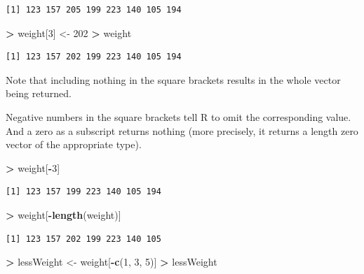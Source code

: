 \documentclass[]{krantz}
\makeatletter
\newenvironment{Shaded}{\begin{snugshade}}{\end{snugshade}}
\newcommand{\DecValTok}[1]{\textcolor[rgb]{0.06,0.06,0.06}{#1}}
\newcommand{\KeywordTok}[1]{\textcolor[rgb]{0.27,0.27,0.27}{\textbf{#1}}}
\newcommand{\NormalTok}[1]{#1}
\newcommand{\OperatorTok}[1]{\textcolor[rgb]{0.43,0.43,0.43}{\textbf{#1}}}
\newcommand{\StringTok}[1]{\textcolor[rgb]{0.5,0.5,0.5}{#1}}
\newenvironment{kframe}{%
\medskip{}
\setlength{\fboxsep}{.8em}
 \def\at@end@of@kframe{}%
 \ifinner\ifhmode%
  \def\at@end@of@kframe{\end{minipage}}%
  \begin{minipage}{\columnwidth}%
 \fi\fi%
 \def\FrameCommand##1{\hskip\@totalleftmargin \hskip-\fboxsep
 \colorbox{shadecolor}{##1}\hskip-\fboxsep
     \hskip-\linewidth \hskip-\@totalleftmargin \hskip\columnwidth}%
 \MakeFramed {\advance\hsize-\width
   \@totalleftmargin\z@ \linewidth\hsize
   \@setminipage}}%
 {\par\unskip\endMakeFramed%
 \at@end@of@kframe}
\renewenvironment{Shaded}{\begin{kframe}}{\end{kframe}}
\makeatother
\begin{document}
\begin{verbatim}
[1] 123 157 205 199 223 140 105 194
\end{verbatim}

\begin{Shaded}
\begin{Highlighting}[]
\OperatorTok{>}\StringTok{ }\NormalTok{weight[}\DecValTok{3}\NormalTok{] <-}\StringTok{ }\DecValTok{202}
\OperatorTok{>}\StringTok{ }\NormalTok{weight}
\end{Highlighting}
\end{Shaded}

\begin{verbatim}
[1] 123 157 202 199 223 140 105 194
\end{verbatim}

Note that including nothing in the square brackets results in the whole vector being returned.

Negative numbers in the square brackets tell R to omit the corresponding value. And a zero as a subscript returns nothing (more precisely, it returns a length zero vector of the appropriate type).

\begin{Shaded}
\begin{Highlighting}[]
\OperatorTok{>}\StringTok{ }\NormalTok{weight[}\OperatorTok{-}\DecValTok{3}\NormalTok{]}
\end{Highlighting}
\end{Shaded}

\begin{verbatim}
[1] 123 157 199 223 140 105 194
\end{verbatim}

\begin{Shaded}
\begin{Highlighting}[]
\OperatorTok{>}\StringTok{ }\NormalTok{weight[}\OperatorTok{-}\KeywordTok{length}\NormalTok{(weight)]}
\end{Highlighting}
\end{Shaded}

\begin{verbatim}
[1] 123 157 202 199 223 140 105
\end{verbatim}

\begin{Shaded}
\begin{Highlighting}[]
\OperatorTok{>}\StringTok{ }\NormalTok{lessWeight <-}\StringTok{ }\NormalTok{weight[}\OperatorTok{-}\KeywordTok{c}\NormalTok{(}\DecValTok{1}\NormalTok{, }\DecValTok{3}\NormalTok{, }\DecValTok{5}\NormalTok{)]}
\OperatorTok{>}\StringTok{ }\NormalTok{lessWeight}
\end{Highlighting}
\end{Shaded}
\end{document}
